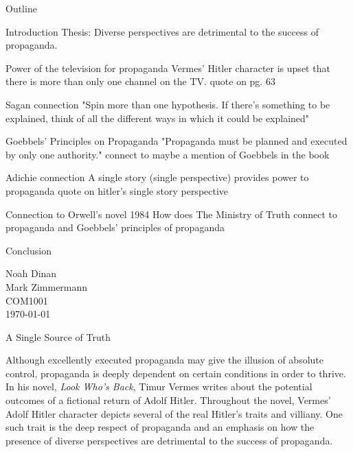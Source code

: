 \documentclass[12pt]{article}
\begin{document}
\begin{center}
Outline
\end{center}

\begin{outline}[enumerate]
\1 Introduction
    \2 Thesis: Diverse perspectives are detrimental to the success of propaganda.

\1 Power of the television for propaganda
    \2 Vermes' Hitler character is upset that there is more than only one channel on the TV.
    \2 quote on pg. 63

\1 Sagan connection
    \2 "Spin more than one hypothesis. If there’s something to be explained, 
        think of all the different ways in which it could be explained"

\1 Goebbels' Principles on Propaganda
    \2 "Propaganda must be planned and executed by only one authority."
    \2 connect to maybe a mention of Goebbels in the book

\1 Adichie connection
    \2 A single story (single perspective) provides power to propaganda
    \2 quote on hitler's single story perspective

\1 Connection to Orwell's novel 1984
    \2 How does The Ministry of Truth connect to propaganda and Goebbels'
       principles of propaganda

\1 Conclusion

\end{outline}

\newpage

\noindent
Noah Dinan \\ Mark Zimmermann \\ COM1001 \\ \today \\

\begin{center}
A Single Source of Truth
\end{center}

\setlength{\parindent}{0.5in}

Although excellently executed propaganda may give the illusion of absolute control, propaganda is
deeply dependent on certain conditions in order to thrive. In his novel, \textit{Look Who's Back}, Timur Vermes
writes about the potential outcomes of a fictional return of Adolf Hitler. Throughout the novel, Vermes'
Adolf Hitler character depicts several of the real Hitler's traits and villiany. One such trait is the 
deep respect of propaganda and an emphasis on how the presence of diverse perspectives are detrimental to the
success of propaganda.
\end{document}
